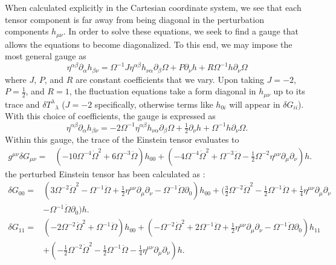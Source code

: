 \documentclass[10pt,letterpaper]{article}
\begin{document}
When calculated explicitly in the Cartesian coordinate system, we see that each tensor component is far away from being diagonal in the perturbation components $h_{\mu\nu}$. In order to solve these equations, we seek to find a gauge that allows the equations to become diagonalized. To this end, we may impose the most general gauge as
\begin{equation}
	\eta^{\alpha\beta}\partial_{\alpha}h_{\beta\nu} = \Omega^{-1} J \eta^{\alpha\beta}h_{\nu\alpha}\partial_\beta \Omega + P \partial_\nu h + R \Omega^{-1} h \partial_\nu \Omega
\end{equation}
where $J$, $P$, and $R$ are constant coefficients that we vary. Upon taking $J = -2$, $P = \tfrac12$, and $R = 1$, the fluctuation equations take a form diagonal in $h_{\mu\nu}$ up to its trace and $\delta T^\lambda{}_{\lambda}$ ($J=-2$ specifically, otherwise terms like $h_{0i}$ will appear in $\delta G_{ii}$). With this choice of coefficients, the gauge is expressed as
\begin{equation}
	\eta^{\alpha\beta}\partial_{\alpha}h_{\beta\nu} = -2 \Omega^{-1}  \eta^{\alpha\beta}h_{\nu\alpha}\partial_\beta \Omega + \tfrac{1}{2} \partial_\nu h +  \Omega^{-1} h \partial_\nu \Omega.
\end{equation}
Within this gauge, the trace of the Einstein tensor evaluates to
\begin{align}
g^{\mu\nu}\delta G_{\mu\nu}={}&(-10 \Omega^{-4} \dot{\Omega}^2
 + 6 \Omega^{-3} \ddot{\Omega}) h_{00}
 + (-4 \Omega^{-4} \dot{\Omega}^2
 + \Omega^{-3} \ddot{\Omega}
 -  \tfrac{1}{2} \Omega^{-2} \eta^{\mu \nu} \partial_{\mu} \partial_{\nu}) h.
\end{align}
the perturbed Einstein tensor has been calculated as :
\begin{align}
\delta G_{00}={}&(3 \Omega^{-2} \dot{\Omega}^2
 -  \Omega^{-1} \ddot{\Omega}
 + \tfrac{1}{2} \eta^{\mu \nu} \partial_{\mu} \partial_{\nu}
 -  \Omega^{-1} \dot{\Omega} \partial_{0}) h_{00}
 + (\tfrac{3}{2} \Omega^{-2} \dot{\Omega}^2
 -  \tfrac{1}{2} \Omega^{-1} \ddot{\Omega}
 + \tfrac{1}{4} \eta^{\mu \nu} \partial_{\mu} \partial_{\nu}\nonumber\\
& -  \Omega^{-1} \dot{\Omega} \partial_{0}) h.
\end{align}
\begin{align}
\delta G_{11}={}&(-2 \Omega^{-2} \dot{\Omega}^2
 + \Omega^{-1} \ddot{\Omega}) h_{00}
 + (- \Omega^{-2} \dot{\Omega}^2
 + 2 \Omega^{-1} \ddot{\Omega}
 + \tfrac{1}{2} \eta^{\mu \nu} \partial_{\mu} \partial_{\nu}
 -  \Omega^{-1} \dot{\Omega} \partial_{0}) h_{11}\nonumber\\
& + (- \tfrac{1}{2} \Omega^{-2} \dot{\Omega}^2
 -  \tfrac{1}{2} \Omega^{-1} \ddot{\Omega}
 -  \tfrac{1}{4} \eta^{\mu \nu} \partial_{\mu} \partial_{\nu}) h.
\end{align}
\end{document}
